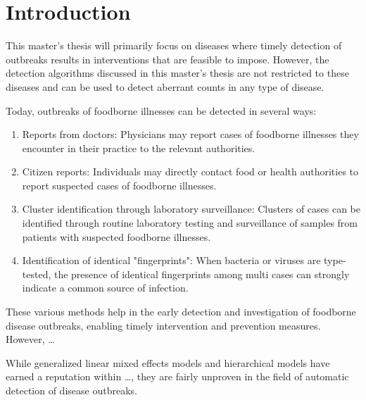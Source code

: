 \documentclass[a4paper,twoside,11pt]{report} %
\theoremstyle{definition}
\theoremstyle{definition}
\theoremstyle{definition}
\theoremstyle{definition}
\theoremstyle{remark}
\begin{document}

\pagecolor{white}
\pagestyle{empty}
\cleardoublepage 

\clearpage 
\pagestyle{main}

\clearpage 

\clearpage 

\clearpage 

\cleardoublepage 
\tableofcontents
\cleardoublepage 

\chapter{Introduction}

This master's thesis will primarily focus on diseases where timely detection of outbreaks results in interventions that are feasible to impose. However, the detection algorithms discussed in this master's thesis are not restricted to these diseases and can be used to detect aberrant counts in any type of disease.

Today, outbreaks of foodborne illnesses can be detected in several ways:

\begin{enumerate}
  \item Reports from doctors: Physicians may report cases of foodborne illnesses they encounter in their practice to the relevant authorities.
  \item Citizen reports: Individuals may directly contact food or health authorities to report suspected cases of foodborne illnesses.
  \item Cluster identification through laboratory surveillance: Clusters of cases can be identified through routine laboratory testing and surveillance of samples from patients with suspected foodborne illnesses.
  \item Identification of identical "fingerprints": When bacteria or viruses are type-tested, the presence of identical fingerprints among multi cases can strongly indicate a common source of infection.
\end{enumerate}

These various methods help in the early detection and investigation of foodborne disease outbreaks, enabling timely intervention and prevention measures. However, \ldots{}

While generalized linear mixed effects models and hierarchical models have earned a reputation within \ldots, they are fairly unproven in the field of automatic detection of disease outbreaks.
\end{document}
